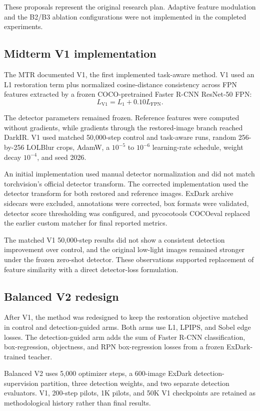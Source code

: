 These proposals represent the original research plan. Adaptive feature
modulation and the B2/B3 ablation configurations were not implemented in
the completed experiments.

\subsection{Midterm V1 implementation}

The MTR documented V1, the first implemented task-aware method. V1 used
an L1 restoration term plus normalized cosine-distance consistency across
FPN features extracted by a frozen COCO-pretrained Faster R-CNN
ResNet-50 FPN:
\[
L_{\mathrm{V1}}
=
L_1
+
0.10L_{\mathrm{FPN}}.
\]

The detector parameters remained frozen. Reference features were computed
without gradients, while gradients through the restored-image branch
reached DarkIR. V1 used matched 50,000-step control and task-aware runs,
random 256-by-256 LOLBlur crops, AdamW, a \(10^{-5}\) to \(10^{-6}\)
learning-rate schedule, weight decay \(10^{-4}\), and seed 2026.

An initial implementation used manual detector normalization and did not
match torchvision's official detector transform. The corrected
implementation used the detector transform for both restored and reference
images. ExDark archive sidecars were excluded, annotations were corrected,
box formats were validated, detector score thresholding was configured,
and pycocotools COCOeval replaced the earlier custom matcher for final
reported metrics.

The matched V1 50,000-step results did not show a consistent detection
improvement over control, and the original low-light images remained
stronger under the frozen zero-shot detector. These observations supported
replacement of feature similarity with a direct detector-loss formulation.

\subsection{Balanced V2 redesign}

After V1, the method was redesigned to keep the restoration objective
matched in control and detection-guided arms. Both arms use L1, LPIPS,
and Sobel edge losses. The detection-guided arm adds the sum of Faster
R-CNN classification, box-regression, objectness, and RPN box-regression
losses from a frozen ExDark-trained teacher.

Balanced V2 uses 5,000 optimizer steps, a 600-image ExDark
detection-supervision partition, three detection weights, and two separate
detection evaluators. V1, 200-step pilots, 1K pilots, and 50K V1
checkpoints are retained as methodological history rather than final
results.

